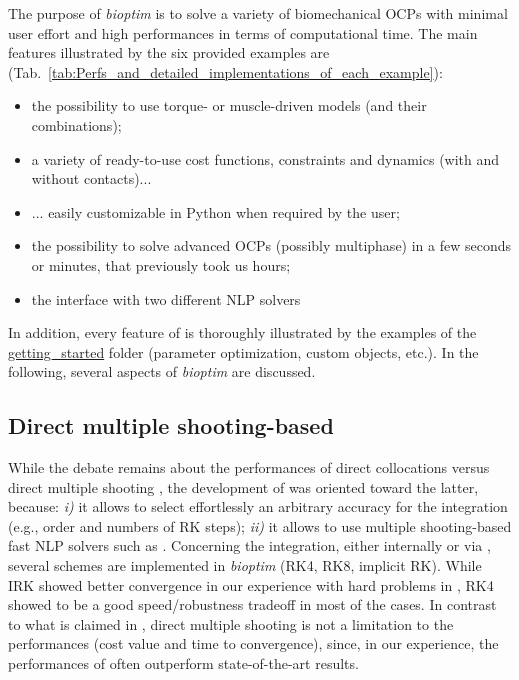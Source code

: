 The purpose of \textit{bioptim} is to solve a variety of biomechanical OCPs with minimal user effort and high performances in terms of computational time. 
The main features illustrated by the six provided examples are (Tab.~\ref{tab:Perfs_and_detailed_implementations_of_each_example}): 
\begin{itemize}
\item the possibility to use torque- or muscle-driven models (and their combinations);
\item a variety of ready-to-use cost functions, constraints and dynamics (with and without contacts)...
\item ... easily customizable in Python when required by the user;
\item the possibility to solve advanced OCPs (possibly multiphase) in a few seconds or minutes, that previously took us hours;
\item the interface with two different NLP solvers
\end{itemize}
In addition, every feature of \bioptim is thoroughly illustrated by the examples of the \href{https://github.com/pyomeca/bioptim/tree/master/examples/getting_started}{getting\_started} folder (parameter optimization, custom objects, etc.).
In the following, several aspects of \textit{bioptim} are discussed.


\subsection{Direct multiple shooting-based}

While the debate remains about the performances of direct collocations versus direct multiple shooting \cite{diehl2006fast, porsa2016direct}, the development of \bioptim was oriented toward the latter, because: \textit{i)} it allows to select effortlessly an arbitrary accuracy for the integration (e.g., order and numbers of RK steps); \textit{ii)} it allows to use multiple shooting-based fast NLP solvers such as \acados.
Concerning the integration, either internally or via \acados, several schemes are implemented in \textit{bioptim} (RK4, RK8, implicit RK).
While IRK showed better convergence in our experience with hard problems in \acados, RK4 showed to be a good speed/robustness tradeoff in most of the cases. 
In contrast to what is claimed in \cite{porsa2016direct}, direct multiple shooting is not a limitation to the performances (cost value and time to convergence), since, in our experience, the performances of \bioptim often outperform state-of-the-art results.


